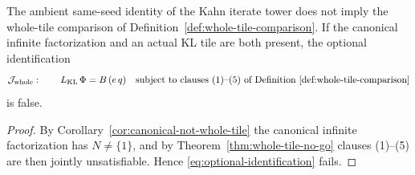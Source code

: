 \begin{corollary}\label{cor:optional-input-fails}
The ambient same-seed identity of the Kahn iterate tower does not imply the whole-tile comparison of Definition~\ref{def:whole-tile-comparison}.  If the canonical infinite factorization and an actual KL tile are both present, the optional identification
\begin{equation}\label{eq:optional-identification}
\mathcal J_{\mathrm{whole}}:\qquad L_{\mathrm{KL}}\,\Phi=B\,(e\,q)\quad\text{subject to clauses (1)--(5) of Definition~\ref{def:whole-tile-comparison}}
\end{equation}
is false.
\end{corollary}

\begin{proof}
By Corollary~\ref{cor:canonical-not-whole-tile} the canonical infinite factorization has \(N\ne\{1\}\), and by Theorem~\ref{thm:whole-tile-no-go} clauses (1)--(5) are then jointly unsatisfiable.  Hence \eqref{eq:optional-identification} fails.
\end{proof}